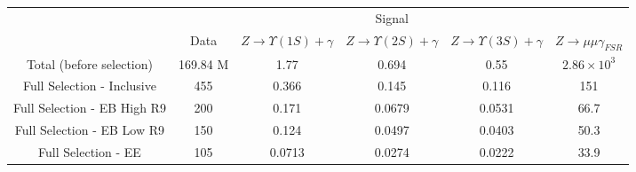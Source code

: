 

\begin{tabular}{c|c|c|c|c|c}
\hline
\hline

&  &  \multicolumn{3}{c|}{Signal} &    \\
\cline{3-5}
& Data & $Z \rightarrow \Upsilon(1S)+\gamma$ & $Z \rightarrow \Upsilon(2S)+\gamma$ & $Z \rightarrow \Upsilon(3S)+\gamma$ &  $Z \rightarrow \mu\mu\gamma_{FSR}$  \\
\hline
Total (before selection) & 169.84 M &  1.77 & 0.694 & 0.55 & $2.86 \times 10^{3}$  \\
\hline\hline
Full Selection - Inclusive & 455  &  0.366 &  0.145 &  0.116 &  151  \\
Full Selection - EB High R9 & 200  &  0.171 &  0.0679 &  0.0531 &  66.7  \\
Full Selection - EB Low R9 & 150  &  0.124 &  0.0497 &  0.0403 &  50.3  \\
Full Selection - EE & 105  &  0.0713 &  0.0274 &  0.0222 &  33.9 \\

\end{tabular}

